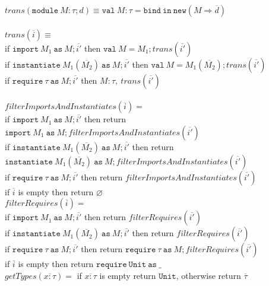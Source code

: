\documentclass{llncs}
\newcommand{\keywadj}[1]{\mathtt{#1}}
\newcommand{\keyw}[1]{\keywadj{#1}~}
\begin{document}
\noindent$trans(\keyw{module} M : \tau; d) \equiv \keyw{val} M : \tau = \keyw{bind} \keyw{in} \keywadj{new}(M \Rightarrow \overline{d})$
\\\\
\noindent$\textit{trans}(\overline{i}) \equiv$\\
\indent if $\keyw{import} M_1~\keyw{as} M; \overline{i'}$ then $\keyw{val} M = M_1; trans(\overline{i'})$\\
\indent if $\keyw{instantiate} M_1(\overline{M_2})~\keyw{as} M; \overline{i'}$ then $ \keyw{val} M = M_1(\overline{M_2}); trans(\overline{i'})$\\
\indent if $\keyw{require} \tau~\keyw{as} M; \overline{i'}$ then $ M : \tau,~trans(\overline{i'})$\\
\\
$filterImportsAndInstantiates(\overline{i}) = $\\
\indent if $\keyw{import} M_1~\keyw{as} M; \overline{i'}$ then return $\keyw{import} M_1~\keyw{as} M; filterImportsAndInstantiates(\overline{i'})$\\
\indent if $\keyw{instantiate} M_1(\overline{M_2})~\keyw{as} M; \overline{i'}$ then return $\keyw{instantiate} M_1(\overline{M_2})~\keyw{as} M; filterImportsAndInstantiates(\overline{i'})$\\
\indent if $\keyw{require} \tau~\keyw{as} M; \overline{i'}$ then return $filterImportsAndInstantiates(\overline{i'})$\\
\indent if $\overline{i}$ is empty then return $\varnothing$ \\

\noindent$filterRequires(\overline{i}) = $\\
\indent if $\keyw{import} M_1~\keyw{as} M; \overline{i'}$ then return $filterRequires(\overline{i'})$\\
\indent if $\keyw{instantiate} M_1(\overline{M_2})~\keyw{as} M; \overline{i'}$ then return $filterRequires(\overline{i'})$\\
\indent if $\keyw{require} \tau~\keyw{as} M; \overline{i'}$ then return $\keyw{require} \tau~\keyw{as} M; filterRequires(\overline{i'})$\\
\indent if $\overline{i}$ is empty then return $\keyw{require} \keyw{Unit} \keyw{as} \_$ \\

\noindent$getTypes(\overline{x : \tau}) = $ if $\overline{x : \tau}$ is empty return $\keywadj{Unit}$, otherwise return $\overline{\tau}$\\
\end{document}

